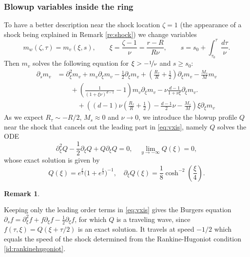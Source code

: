 \documentclass[11pt]{aims}
\theoremstyle{definition}
\newtheorem{remark}[theorem]{Remark}
\newcommand{\pa}{\partial}
\numberwithin{equation}{section}
\begin{document}
\subsubsection{Blowup variables inside the ring} To have a better description near the shock location $\zeta = 1$ (the appearance of a shock being explained in Remark \eqref{re:shock}) we change variables
\begin{equation}\label{def:xis}
m_w(\zeta,\tau)=m_v(\xi,s),\qquad \xi=\frac{\zeta-1}{\nu}=\frac{r-R}{R\nu}, \qquad s=s_0+\int_{\tau_0}^\tau \frac{d\tau}{\nu}.
\end{equation}
Then $m_v$ solves the following equation for $\xi>-\nicefrac{1}{\nu}$ and $s\geq s_0$:
\begin{align}
\pa_s m_v &=\pa_\xi^2 m_v +m_v\pa_\xi m_v-\frac{1}{2}\pa_\xi m_v+\left(\frac{R_\tau}{R}+\frac{1}{2} \right)\pa_\xi m_v-\frac{M_s}{M}m_v\nonumber \\
&\qquad +\left(\frac{1}{(1+\xi\nu)^{d-1}}-1 \right)m_v \pa_\xi m_v -\nu \frac{d-1}{1+\nu\xi}\pa_\xi m_v. \label{eq:vxis} \\
\nonumber & \qquad \quad + \left( (d-1)\nu \left(\frac{R_\tau}{R}+\frac 12\right)-\frac{d-1}{2}\nu-\frac{M_s}{M} \right) \xi \pa_\xi m_v
\end{align}
As we expect $R_\tau\sim -R/2$, $M_s\approx 0$ and $\nu \to 0$, we introduce the blowup profile $Q$ near the shock that cancels out the leading part in \eqref{eq:vxis}, namely $Q$ solves the ODE
\begin{equation}\label{eq:Q}
\pa_\xi^2 Q - \frac 12 \pa_\xi Q + Q\pa_\xi Q = 0, \quad \lim_{y \to -\infty} Q(\xi) = 0,
\end{equation}
whose exact solution is given by 
\begin{equation}\label{def:Qxi}
Q(\xi) =  e^{\frac \xi2}\big(1 + e^{\frac \xi2}\big)^{-1}, \quad \pa_\xi Q(\xi) =\frac{1}{8}\cosh^{-2}(\frac \xi 4).
\end{equation}

\begin{remark} \label{re:burgers}

Keeping only the leading order terms in \eqref{eq:vxis} gives the Burgers equation $\pa_s f=\pa_\xi^2 f +f\pa_\xi f-\frac{1}{2}\pa_\xi f$, for which $Q$ is a traveling wave, since $f(\tau,\xi)=Q(\xi+\tau/2)
$ is an exact solution. It travels at speed $-1/2$ which equals the speed of the shock determined from the Rankine-Hugoniot condition \eqref{id:rankinehugoniot}.

\end{remark}
\end{document}
